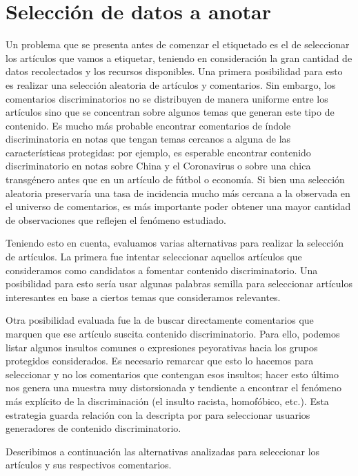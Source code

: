 \section{Selección de datos a anotar}


Un problema que se presenta antes de comenzar el etiquetado es el de seleccionar los artículos que vamos a etiquetar, teniendo en consideración la gran cantidad de datos recolectados y los recursos disponibles. Una primera posibilidad para esto es realizar una selección aleatoria de artículos y comentarios. Sin embargo, los comentarios discriminatorios no se distribuyen de manera uniforme entre los artículos sino que se concentran sobre algunos temas que generan este tipo de contenido. Es mucho más probable encontrar comentarios de índole discriminatoria en notas que tengan temas cercanos a alguna de las características protegidas: por ejemplo, es esperable encontrar contenido discriminatorio en notas sobre China y el Coronavirus o sobre una chica transgénero antes que en un artículo de fútbol o economía. Si bien una selección aleatoria preservaría una tasa de incidencia mucho más cercana a la observada en el universo de comentarios, es más importante poder obtener una mayor cantidad de observaciones que reflejen el fenómeno estudiado.

Teniendo esto en cuenta, evaluamos varias alternativas para realizar la selección de artículos. La primera fue intentar seleccionar aquellos artículos que consideramos como candidatos a fomentar contenido discriminatorio. Una posibilidad para esto sería usar algunas palabras semilla para seleccionar artículos interesantes en base a ciertos temas que consideramos relevantes.

Otra posibilidad evaluada fue la de buscar directamente comentarios que marquen que ese artículo suscita contenido discriminatorio. Para ello, podemos listar algunos insultos comunes o expresiones peyorativas hacia los grupos protegidos considerados. Es necesario remarcar que esto lo hacemos para seleccionar  y no los comentarios que contengan esos insultos; hacer esto último nos genera una muestra muy distorsionada y tendiente a encontrar el fenómeno más explícito de la discriminación (el insulto racista, homofóbico, etc.). Esta estrategia guarda relación con la descripta por \citet{hateval2019semeval} para seleccionar usuarios generadores de contenido discriminatorio.

Describimos a continuación las alternativas analizadas para seleccionar los artículos y sus respectivos comentarios.


